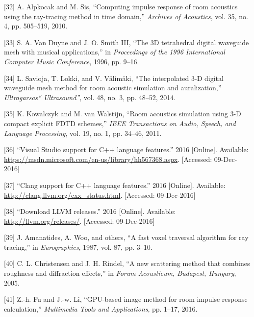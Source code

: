 \documentclass[]{scrreprt}
\begin{document}
\hypertarget{ref-alpkocakux5fcomputingux5f2010}{}
{[}32{]} A. Alpkocak and M. Sis, ``Computing impulse response of room
acoustics using the ray-tracing method in time domain,'' \emph{Archives
of Acoustics}, vol. 35, no. 4, pp. 505--519, 2010.

\hypertarget{ref-vanux5fduyneux5f3dux5f1996}{}
{[}33{]} S. A. Van Duyne and J. O. Smith III, ``The 3D tetrahedral
digital waveguide mesh with musical applications,'' in \emph{Proceedings
of the 1996 International Computer Music Conference}, 1996, pp. 9--16.

\hypertarget{ref-saviojaux5finterpolatedux5f2014}{}
{[}34{]} L. Savioja, T. Lokki, and V. Välimäki, ``The interpolated 3-D
digital waveguide mesh method for room acoustic simulation and
auralization,'' \emph{Ultragarsas`` Ultrasound''}, vol. 48, no. 3, pp.
48--52, 2014.

\hypertarget{ref-kowalczykux5froomux5f2011}{}
{[}35{]} K. Kowalczyk and M. van Walstijn, ``Room acoustics simulation
using 3-D compact explicit FDTD schemes,'' \emph{IEEE Transactions on
Audio, Speech, and Language Processing}, vol. 19, no. 1, pp. 34--46,
2011.

\hypertarget{ref-ux5fvisualux5f2016}{}
{[}36{]} ``Visual Studio support for C++ language features.'' 2016
{[}Online{]}. Available:
\url{https://msdn.microsoft.com/en-us/library/hh567368.aspx}.
{[}Accessed: 09-Dec-2016{]}

\hypertarget{ref-ux5fclangux5f2016}{}
{[}37{]} ``Clang support for C++ language features.'' 2016 {[}Online{]}.
Available: \url{http://clang.llvm.org/cxx_status.html}. {[}Accessed:
09-Dec-2016{]}

\hypertarget{ref-ux5fdownloadux5f2016}{}
{[}38{]} ``Download LLVM releases.'' 2016 {[}Online{]}. Available:
\url{http://llvm.org/releases/}. {[}Accessed: 09-Dec-2016{]}

\hypertarget{ref-amanatidesux5ffastux5f1987}{}
{[}39{]} J. Amanatides, A. Woo, and others, ``A fast voxel traversal
algorithm for ray tracing,'' in \emph{Eurographics}, 1987, vol. 87, pp.
3--10.

\hypertarget{ref-christensenux5fnewux5f2005}{}
{[}40{]} C. L. Christensen and J. H. Rindel, ``A new scattering method
that combines roughness and diffraction effects,'' in \emph{Forum
Acousticum, Budapest, Hungary}, 2005.

\hypertarget{ref-fuux5fgpu-basedux5f2016}{}
{[}41{]} Z.-h. Fu and J.-w. Li, ``GPU-based image method for room
impulse response calculation,'' \emph{Multimedia Tools and
Applications}, pp. 1--17, 2016.
\end{document}
